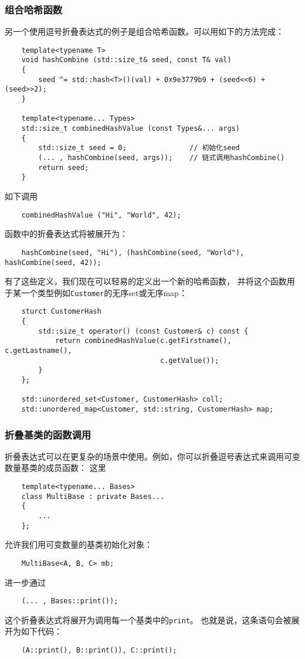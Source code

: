 \subsubsection*{组合哈希函数}
另一个使用逗号折叠表达式的例子是组合哈希函数。可以用如下的方法完成：
\begin{lstlisting}
    template<typename T>
    void hashCombine (std::size_t& seed, const T& val)
    {
        seed ^= std::hash<T>()(val) + 0x9e3779b9 + (seed<<6) + (seed>>2);
    }

    template<typename... Types>
    std::size_t combinedHashValue (const Types&... args)
    {
        std::size_t seed = 0;               // 初始化seed
        (... , hashCombine(seed, args));    // 链式调用hashCombine()
        return seed;
    }
\end{lstlisting}
如下调用
\begin{lstlisting}
    combinedHashValue ("Hi", "World", 42);
\end{lstlisting}
函数中的折叠表达式将被展开为：
\begin{lstlisting}
    hashCombine(seed, "Hi"), (hashCombine(seed, "World"), hashCombine(seed, 42));
\end{lstlisting}
有了这些定义，我们现在可以轻易的定义出一个新的哈希函数，
并将这个函数用于某一个类型例如\texttt{Customer}的无序set或无序map：
\begin{lstlisting}
    sturct CustomerHash
    {
        std::size_t operator() (const Customer& c) const {
            return combinedHashValue(c.getFirstname(), c.getLastname(),
                                     c.getValue());
        }
    };

    std::unordered_set<Customer, CustomerHash> coll;
    std::unordered_map<Customer, std::string, CustomerHash> map;
\end{lstlisting}

\subsubsection*{折叠基类的函数调用}
折叠表达式可以在更复杂的场景中使用。例如，你可以折叠逗号表达式来调用可变数量基类的成员函数：
这里
\begin{lstlisting}
    template<typename... Bases>
    class MultiBase : private Bases...
    {
        ...
    };
\end{lstlisting}
允许我们用可变数量的基类初始化对象：
\begin{lstlisting}
    MultiBase<A, B, C> mb;
\end{lstlisting}
进一步通过
\begin{lstlisting}
    (... , Bases::print());
\end{lstlisting}
这个折叠表达式将展开为调用每一个基类中的\texttt{print}。
也就是说，这条语句会被展开为如下代码：
\begin{lstlisting}
    (A::print(), B::print()), C::print();
\end{lstlisting}

